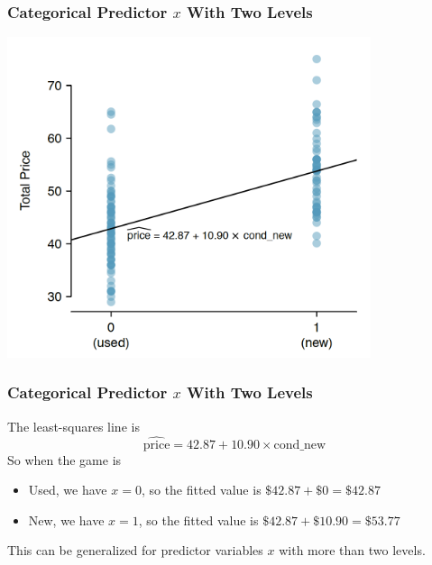 \documentclass[handout]{beamer}
\begin{document}
\begin{frame}[fragile]
\frametitle{Categorical Predictor $x$ With Two Levels}

\begin{center}
\includegraphics[width=0.8\textwidth]{figure/mario_kart.png}
\end{center}

\end{frame}


\begin{frame}[fragile]
\frametitle{Categorical Predictor $x$ With Two Levels}
The least-squares line is
\[
\widehat{\mbox{price}} = 42.87 + 10.90 \times \mbox{cond\_new}
\]
\pause
So when the game is
\begin{itemize}
\item Used, we have $x=0$, so the fitted value is $\$42.87 + \$0 = \$42.87$
\item New, we have $x=1$, so the fitted value is $\$42.87 + \$10.90 = \$53.77$
\end{itemize}
\pause
This can be generalized for predictor variables $x$ with more than two levels.

\end{frame}
\end{document}
